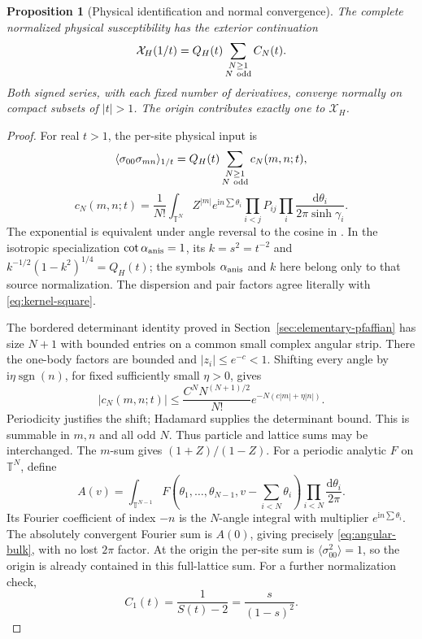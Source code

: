 \documentclass[11pt]{article}
\numberwithin{equation}{section}
\newtheorem{proposition}[theorem]{Proposition}
\theoremstyle{remark}\newtheorem{remark}[theorem]{Remark}
\newcommand{\ii}{\mathrm i}
\newcommand{\dd}{\mathrm d}
\newcommand{\T}{\mathbb T}
\newcommand{\X}{\mathcal X_H}
\begin{document}
\begin{proposition}[Physical identification and normal convergence]
\label{prop:angular-bulk}
The complete normalized physical susceptibility has the exterior
continuation
\begin{equation}\label{eq:bulk}
 \X(1/t)=Q_H(t)\sum_{\substack{N\ge1\\N\ {\rm odd}}} C_N(t).
\end{equation}
Both signed series, with each fixed number of derivatives, converge
normally on compact subsets of $|t|>1$.
The origin contributes exactly one to $\X$.
\end{proposition}
\begin{proof}
For real $t>1$, the per-site physical input is
\[
 \langle\sigma_{00}\sigma_{mn}\rangle_{1/t}
  =Q_H(t)\sum_{\substack{N\ge1\\N\ {\rm odd}}}c_N(m,n;t),
\]
\[
 c_N(m,n;t)=\frac1{N!}\int_{\T^N}
 Z^{|m|}e^{\ii n\sum\theta_i}\prod_{i<j}P_{ij}
                   \prod_i\frac{\dd\theta_i}{2\pi\sinh\gamma_i}.
\]
The exponential is equivalent under angle reversal to the cosine
in \cite[eq.~(4.2)]{Orrick}. In the isotropic specialization
$\cot\alpha_{\rm anis}=1$, its $k=s^2=t^{-2}$ and
$k^{-1/2}(1-k^2)^{1/4}=Q_H(t)$; the symbols $\alpha_{\rm anis}$
and $k$ here belong only to that source normalization.
The dispersion and pair factors agree literally with
\eqref{eq:kernel-square}.

The bordered determinant identity proved in
Section~\ref{sec:elementary-pfaffian} has size $N+1$ with bounded
entries on a common small complex angular strip. There the
one-body factors are bounded and $|z_i|\le e^{-c}<1$.
Shifting every angle by $\ii\eta\operatorname{sgn}(n)$, for
fixed sufficiently small $\eta>0$, gives
\[
 |c_N(m,n;t)|\le \frac{C^N N^{(N+1)/2}}{N!}
                   e^{-N(c|m|+\eta|n|)}.
\]
Periodicity justifies the shift; Hadamard supplies the determinant
bound. This is summable in $m,n$ and all odd $N$.
Thus particle and lattice sums may be interchanged.
The $m$-sum gives $(1+Z)/(1-Z)$.
For a periodic analytic $F$ on $\T^N$, define
\[
 A(v)=\int_{\T^{N-1}}
 F(\theta_1,\ldots,\theta_{N-1},v-\textstyle\sum_{i<N}\theta_i)
                   \prod_{i<N}\frac{\dd\theta_i}{2\pi}.
\]
Its Fourier coefficient of index $-n$ is the $N$-angle integral
with multiplier $e^{\ii n\sum\theta_i}$.
The absolutely convergent Fourier sum is $A(0)$, giving precisely
\eqref{eq:angular-bulk}, with no lost $2\pi$ factor.
At the origin the per-site sum is $\langle\sigma_{00}^2\rangle=1$,
so the origin is already contained in this full-lattice sum.
For a further normalization check,
\[
 C_1(t)=\frac1{S(t)-2}=\frac{s}{(1-s)^2}.
\]


\end{proof}
\end{document}
